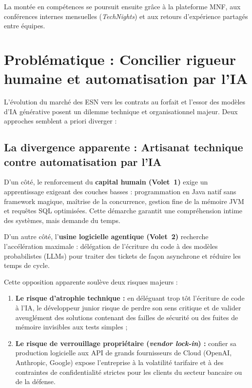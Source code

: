 \documentclass{tnreport}
\begin{document}
La montée en compétences se poursuit ensuite grâce à la plateforme MNF, aux conférences internes mensuelles (\textit{TechNights}) et aux retours d'expérience partagés entre équipes.

\section{Problématique : Concilier rigueur humaine et automatisation par l'IA}
\label{sec:problematique_double}

L'évolution du marché des ESN vers les contrats au forfait et l'essor des modèles d'IA générative posent un dilemme technique et organisationnel majeur. Deux approches semblent a priori diverger :

\subsection{La divergence apparente : Artisanat technique contre automatisation par l'IA}
\label{subsec:divergence_fondamentaux_ia}

D'un côté, le renforcement du \textbf{capital humain (Volet~1)} exige un apprentissage exigeant des couches basses : programmation en Java natif sans framework magique, maîtrise de la concurrence, gestion fine de la mémoire JVM et requêtes SQL optimisées. Cette démarche garantit une compréhension intime des systèmes, mais demande du temps.

D'un autre côté, l'\textbf{usine logicielle agentique (Volet~2)} recherche l'accélération maximale : délégation de l'écriture du code à des modèles probabilistes (LLMs) pour traiter des tickets de façon asynchrone et réduire les temps de cycle.

Cette opposition apparente soulève deux risques majeurs :
\begin{enumerate}
    \item \textbf{Le risque d'atrophie technique :} en déléguant trop tôt l'écriture de code à l'IA, le développeur junior risque de perdre son sens critique et de valider aveuglément des solutions contenant des failles de sécurité ou des fuites de mémoire invisibles aux tests simples ;
    \item \textbf{Le risque de verrouillage propriétaire (\textit{vendor lock-in}) :} confier sa production logicielle aux API de grands fournisseurs de Cloud (OpenAI, Anthropic, Google) expose l'entreprise à la volatilité tarifaire et à des contraintes de confidentialité strictes pour les clients du secteur bancaire ou de la défense.
\end{enumerate}
\end{document}
